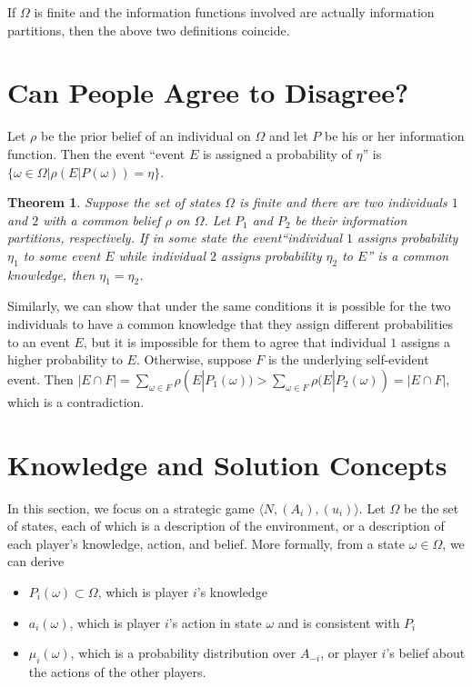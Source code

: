 \documentclass[openany]{book}
\newtheorem{theorem}{Theorem}[chapter]
\begin{document}
If $\Omega$ is finite and the information functions involved are actually information partitions, then the above two definitions coincide.

\section{Can People Agree to Disagree?}
Let $\rho$ be the prior belief of an individual on $\Omega$ and let $P$ be his or her information function. Then the event ``event $E$ is assigned a probability of $\eta$'' is $\{\omega\in\Omega|\rho(E|P(\omega))=\eta\}$.
\begin{theorem}
Suppose the set of states $\Omega$ is finite and there are two individuals $1$ and $2$ with a common belief $\rho$ on $\Omega$. Let $P_1$ and $P_2$ be their information partitions, respectively. If in some state the event``individual $1$ assigns probability $\eta_1$ to some event $E$ while individual $2$ assigns probability $\eta_2$ to $E$'' is a common knowledge, then $\eta_1=\eta_2$.
\end{theorem}

Similarly, we can show that under the same conditions it is possible for the two individuals to have a common knowledge that they assign different probabilities to an event $E$, but it is impossible for them to agree that individual $1$ assigns a higher probability to $E$. Otherwise, suppose $F$ is the underlying self-evident event. Then $|E\cap F|=\sum_{\omega\in F}\rho(E|P_1(\omega))>\sum_{\omega\in F}\rho(E|P_2(\omega))=|E\cap F|$, which is a contradiction.

\section{Knowledge and Solution Concepts}
In this section, we focus on a strategic game $\langle N,(A_i),(u_i)\rangle$. Let $\Omega$ be the set of states, each of which is a description of the environment, or a description of each player's knowledge, action, and belief. More formally, from a state $\omega\in\Omega$, we can derive
\begin{itemize}
\item $P_i(\omega)\subset\Omega$, which is player $i$'s knowledge
\item $a_i(\omega)$, which is player $i$'s action in state $\omega$ and is consistent with $P_i$
\item $\mu_i(\omega)$, which is a probability distribution over $A_{-i}$, or player $i$'s belief about the actions of the other players.
\end{itemize}
\end{document}
